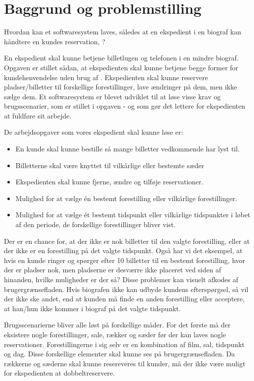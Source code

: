 \chapter{Baggrund og problemstilling}

Hvordan kan et softwaresystem laves, således at en ekspedient i en biograf kan håndtere en kundes reservation,  ?


En ekspedient skal kunne betjene billetlugen og telefonen i en mindre biograf. Opgaven er stillet sådan, at ekspedienten skal kunne betjene begge former for kundehenvendelse uden brug af . Ekspedienten skal kunne reservere pladser/billetter til forskellige forestillinger, lave ændringer på dem, men ikke sælge dem. Et softwaresystem er blevet udviklet til at løse visse krav og brugsscenarier, som er stillet i opgaven - og som gør det lettere for ekspedienten at fuldføre sit arbejde.

De arbejdsopgaver som vores ekspedient skal kunne løse er:
\begin{itemize}
  \item En kunde skal kunne bestille så mange billetter vedkommende har lyst til.
  \item Billetterne skal være knyttet til vilkårlige eller bestemte sæder
  \item Ekspedienten skal kunne fjerne, ændre og tilføje reservationer.
  \item Mulighed for at vælge én bestemt forestilling eller vilkårlige forestillinger.
  \item Mulighed for at vælge ét bestemt tidspunkt eller vilkårlige tidspunkter i løbet af den periode, de forskellige forestillinger bliver vist.
\end{itemize}

Der er en chance for, at der ikke er nok billetter til den valgte forestilling, eller at der ikke er en forestilling på det valgte tidspunkt. Også har vi det eksempel, at hvis en kunde ringer og spørger efter 10 billetter til en bestemt forestilling, hvor der er pladser nok, men pladserne er desværre ikke placeret ved siden af hinanden, hvilke muligheder er der så? Disse problemer kan visuelt afkodes af brugergrænsefladen. Hvis biografen ikke kan udbyde kundens efterspørgsel, så vil der ikke ske andet, end at kunden må finde en anden forestilling eller acceptere, at han/hun ikke kommer i biograf på det valgte tidspunkt.

Brugsscenarierne bliver alle løst på forskellige måder. For det første må der eksistere nogle forestillinger, sale, rækker og sæder før der kan laves nogle reservationer. Forestillingerne i sig selv er en kombination af film, sal, tidspunkt og dag. Disse forskellige elementer skal kunne ses på brugergrænsefladen. Da rækkerne og sæderne skal kunne resereveres til kunder, må der ikke være muligt for ekspedienten at dobbeltreservere.

